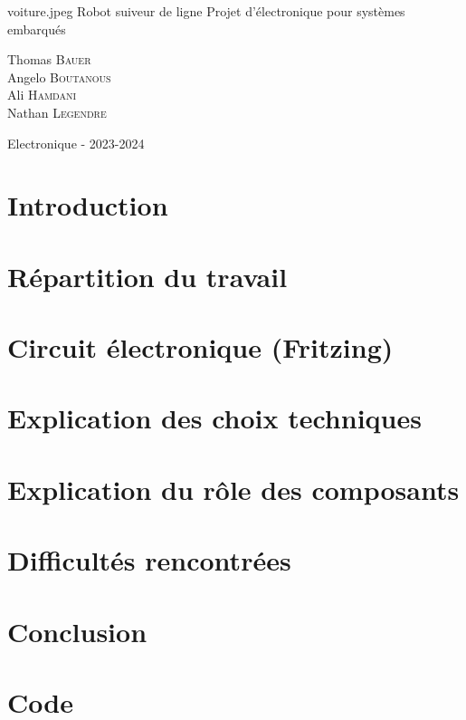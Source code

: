 \documentclass[12pt,a4paper]{article}
\begin{document}
\PageDeGarde
{voiture.jpeg} %
{Robot suiveur de ligne} %
{Projet d'électronique pour systèmes embarqués} %
{

Thomas \textsc{Bauer}\\
Angelo \textsc{Boutanous}\\
Ali \textsc{Hamdani}\\
Nathan \textsc{Legendre}\\

} %
{Electronique - 2023-2024} %


\newpage

\tableofcontents

\newpage

\section{Introduction}


\section{Répartition du travail}


\section{Circuit électronique (Fritzing)}


\section{Explication des choix techniques}


\section{Explication du rôle des composants}


\section{Difficultés rencontrées}


\section{Conclusion}


\section{Code}


\listoffigures
\end{document}
